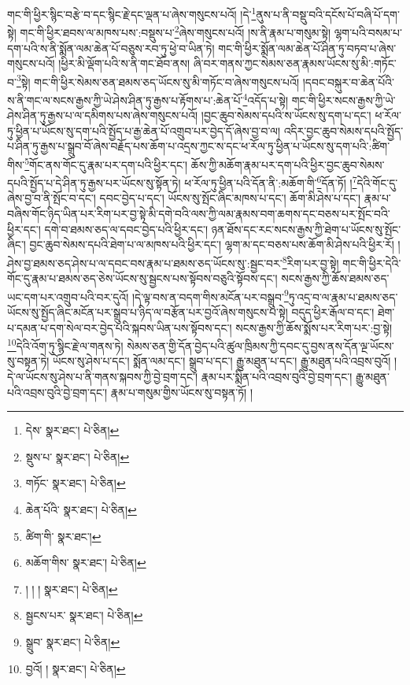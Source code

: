 གང་གི་ཕྱིར་སྙིང་བརྩེ་བ་དང་སྙིང་རྗེ་དང་ལྡན་པ་ཞེས་གསུངས་པའོ། །དེ་\footnote{དེས་  སྣར་ཐང་།  པེ་ཅིན། }ནུས་པ་ནི་བསྡུ་བའི་དངོས་པོ་བཞི་པོ་དག་སྟེ། གང་གི་ཕྱིར་ཐབས་ལ་མཁས་པས་:བསྡུས་པ་\footnote{སྡུས་པ་  སྣར་ཐང་།  པེ་ཅིན། }ཞེས་གསུངས་པའོ། །ས་ནི་རྣམ་པ་གསུམ་སྟེ། ལྷག་པའི་བསམ་པ་དག་པའི་ས་ནི་སྨོན་ལམ་ཆེན་པོ་བཅུས་རབ་ཏུ་ཕྱེ་བ་ཡིན་ཏེ། གང་གི་ཕྱིར་སྨོན་ལམ་ཆེན་པོ་ཤིན་ཏུ་བཏབ་པ་ཞེས་གསུངས་པའོ། །ཕྱིར་མི་ལྡོག་པའི་ས་ནི་གང་ཐོབ་ནས། ཞི་བར་གནས་ཀྱང་སེམས་ཅན་རྣམས་ཡོངས་སུ་མི་:གཏོང་བ་\footnote{གཏོང་  སྣར་ཐང་།  པེ་ཅིན། }སྟེ། གང་གི་ཕྱིར་སེམས་ཅན་ཐམས་ཅད་ཡོངས་སུ་མི་གཏོང་བ་ཞེས་གསུངས་པའོ། །དབང་བསྐུར་བ་ཆེན་པོའི་ས་ནི་གང་ལ་སངས་རྒྱས་ཀྱི་ཡེ་ཤེས་ཤིན་ཏུ་རྒྱས་པ་རྟོགས་པ་:ཆེན་པོ་\footnote{ཆེན་པོའི་  སྣར་ཐང་།  པེ་ཅིན། }འདོད་པ་སྟེ། གང་གི་ཕྱིར་སངས་རྒྱས་ཀྱི་ཡེ་ཤེས་ཤིན་ཏུ་རྒྱས་པ་ལ་དམིགས་པས་ཞེས་གསུངས་པའོ། །བྱང་ཆུབ་སེམས་དཔའི་ས་ཡོངས་སུ་དག་པ་དང་། ཕ་རོལ་ཏུ་ཕྱིན་པ་ཡོངས་སུ་དག་པའི་སྤྱོད་པ་རྒྱ་ཆེན་པོ་འགྲུབ་པར་བྱེད་དོ་ཞེས་བྱ་བ་ལ། འདིར་བྱང་ཆུབ་སེམས་དཔའི་སྤྱོད་པ་ཤིན་ཏུ་རྒྱས་པ་སྒྲུབ་བོ་ཞེས་བརྗོད་པས་ཆོག་པ་འདྲས་ཀྱང་ས་དང་ཕ་རོལ་ཏུ་ཕྱིན་པ་ཡོངས་སུ་དག་པའི་:ཚིག་གིས་\footnote{ཚིག་གི་  སྣར་ཐང་། }གོང་ནས་གོང་དུ་རྣམ་པར་དག་པའི་ཕྱིར་དང་། ཆོས་ཀྱི་མཆོག་རྣམ་པར་དག་པའི་ཕྱིར་བྱང་ཆུབ་སེམས་དཔའི་སྤྱོད་པ་དེ་ཤིན་ཏུ་རྒྱས་པར་ཡོངས་སུ་སྟོན་ཏེ། ཕ་རོལ་ཏུ་ཕྱིན་པའི་དོན་ནི་:མཆོག་གི་\footnote{མཆོག་གིས་  སྣར་ཐང་།  པེ་ཅིན། }དོན་ཏོ། །\footnote{། ། །  སྣར་ཐང་།  པེ་ཅིན། }དེའི་གོང་དུ་ཞེས་བྱ་བ་ནི་སྤོང་བ་དང་། དབང་བྱེད་པ་དང་། ཡོངས་སུ་སྤོང་ཞིང་མཁས་པ་དང་། ཆོག་མི་ཤེས་པ་དང་། རྣམ་པ་བཞིས་གོང་ཉིད་ཡིན་པར་རིག་པར་བྱ་སྟེ་མི་དགེ་བའི་ལས་ཀྱི་ལམ་རྣམས་བག་ཆགས་དང་བཅས་པར་སྤོང་བའི་ཕྱིར་དང་། དགེ་བ་ཐམས་ཅད་ལ་དབང་བྱེད་པའི་ཕྱིར་དང་། ཉན་ཐོས་དང་རང་སངས་རྒྱས་ཀྱི་ཐེག་པ་ཡོངས་སུ་སྤོང་ཞིང་། བྱང་ཆུབ་སེམས་དཔའི་ཐེག་པ་ལ་མཁས་པའི་ཕྱིར་དང་། ལྷག་མ་དང་བཅས་པས་ཆོག་མི་ཤེས་པའི་ཕྱིར་རོ། །ཤེས་བྱ་ཐམས་ཅད་ཤེས་པ་ལ་དབང་བས་རྣམ་པ་ཐམས་ཅད་ཡོངས་སུ་:སྦྱང་བར་\footnote{སྦྱངས་པར་  སྣར་ཐང་།  པེ་ཅིན། }རིག་པར་བྱ་སྟེ། གང་གི་ཕྱིར་དེའི་གོང་དུ་རྣམ་པ་ཐམས་ཅད་ཅེས་ཡོངས་སུ་སྦྱངས་པས་སྟོབས་བཅུའི་སྟོབས་དང་། སངས་རྒྱས་ཀྱི་ཆོས་ཐམས་ཅད་ཡང་དག་པར་འགྲུབ་པའི་བར་དུའོ། །དེ་ལྟ་བས་ན་བདག་གིས་མངོན་པར་བསྒྲུབ་\footnote{སྒྲུབ་  སྣར་ཐང་།  པེ་ཅིན། }ཏུ་འདྲ་བ་ལ་རྣམ་པ་ཐམས་ཅད་ཡོངས་སུ་སྤྱོད་ཞིང་མངོན་པར་སྒྲུབ་པ་ཉིད་ལ་བརྩོན་པར་བྱའོ་ཞེས་གསུངས་པ་སྟེ། བདུད་ཕྱིར་རྒོལ་བ་དང་། ཐེག་པ་དམན་པ་དག་སེལ་བར་བྱེད་པའི་སྐབས་ཡིན་པས་སྟོབས་དང་། སངས་རྒྱས་ཀྱི་ཆོས་སྨོས་པར་རིག་པར་:བྱ་སྟེ། \footnote{བྱའོ། །   སྣར་ཐང་།  པེ་ཅིན། }དེའི་འོག་ཏུ་སྙིང་རྗེ་ལ་གནས་ཏེ། སེམས་ཅན་གྱི་དོན་བྱེད་པའི་ཚུལ་ཁྲིམས་ཀྱི་དབང་དུ་བྱས་ནས་དོན་ལྔ་ཡོངས་སུ་བསྟན་ཏེ། ཡོངས་སུ་ཤེས་པ་དང་། སྨོན་ལམ་དང་། སྒྲུབ་པ་དང་། རྒྱུ་མཐུན་པ་དང་། རྒྱུ་མཐུན་པའི་འབྲས་བུའོ། །དེ་ལ་ཡོངས་སུ་ཤེས་པ་ནི་གནས་སྐབས་ཀྱི་བྱེ་བྲག་དང་། རྣམ་པར་སྨིན་པའི་འབྲས་བུའི་བྱེ་བྲག་དང་། རྒྱུ་མཐུན་པའི་འབྲས་བུའི་བྱེ་བྲག་དང་། རྣམ་པ་གསུམ་གྱིས་ཡོངས་སུ་བསྟན་ཏོ། །
